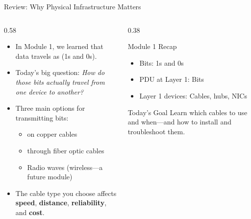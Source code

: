 \documentclass[aspectratio=169]{beamer}  %
\begin{document}
\begin{frame}{Review: Why Physical Infrastructure Matters}
    \begin{columns}[T]
        \begin{column}{0.58\textwidth}
            \begin{itemize}
                \item In Module 1, we learned that data travels as  (1s and 0s).
                \item Today's big question: \textit{How do those bits actually travel from one device to another?}
                \item Three main options for transmitting bits:
                    \begin{itemize}
                        \item {} on copper cables
                        \item {} through fiber optic cables
                        \item Radio waves (wireless---a future module)
                    \end{itemize}
                \item The cable type you choose affects \textbf{speed}, \textbf{distance}, \textbf{reliability}, and \textbf{cost}.
            \end{itemize}
        \end{column}
        \begin{column}{0.38\textwidth}
            \begin{block}{Module 1 Recap}
                \begin{itemize}
                    \item Bits: 1s and 0s
                    \item PDU at Layer 1: Bits
                    \item Layer 1 devices: Cables, hubs, NICs
                \end{itemize}
            \end{block}
            
            \vspace{0.3em}
            \begin{exampleblock}{Today's Goal}
                Learn which cables to use and when---and how to install and troubleshoot them.
            \end{exampleblock}
        \end{column}
    \end{columns}
\end{frame}
\end{document}
